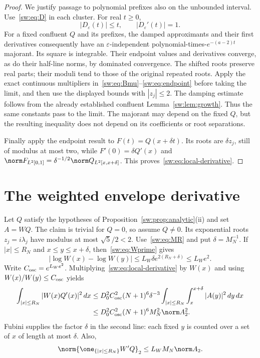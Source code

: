 \documentclass[11pt,a4paper]{article}
\numberwithin{equation}{section}
\theoremstyle{definition}\newtheorem{definition}[theorem]{Definition}
\theoremstyle{remark}\newtheorem{remark}[theorem]{Remark}
\begin{document}
\begin{proof}
We justify passage to polynomial prefixes also on the unbounded interval. Use~\eqref{sw:eq:D} in each cluster. For real $t\ge0$,
\[
 |D_\varepsilon(t)|\le t,\qquad |D_\varepsilon'(t)|=1.
\]
For a fixed confluent $Q$ and its prefixes, the damped approximants and their first derivatives consequently have an $\varepsilon$-independent polynomial-times-$e^{-(a-2)t}$ majorant. Its square is integrable. Their endpoint values and derivatives converge, as do their half-line norms, by dominated convergence. The shifted roots preserve real parts; their moduli tend to those of the original repeated roots. Apply the exact continuous multipliers in~\eqref{sw:eq:Bmu}--\eqref{sw:eq:endpoint} before taking the limit, and then use the displayed bounds with $|z_j|\le2$. The damping estimate follows from the already established confluent Lemma~\ref{sw:lem:growth}. Thus the same constants pass to the limit. The majorant may depend on the fixed $Q$, but the resulting inequality does not depend on its coefficients or root separations.

Finally apply the endpoint result to $F(t)=Q(x+\delta t)$. Its roots are $\delta z_j$, still of modulus at most two, while
$F'(0)=\delta Q'(x)$ and
$\norm F_{L^2[0,1]}=\delta^{-1/2}\norm Q_{L^2[x,x+\delta]}$.
This proves~\eqref{sw:eq:local-derivative}.
\end{proof}

\section{The weighted envelope derivative}\label{sw:sec:weighted}
Let $Q$ satisfy the hypotheses of Proposition~\ref{sw:prop:analytic}(ii) and set $A=WQ$. The claim is trivial for $Q=0$, so assume $Q\ne0$. Its exponential roots $z_j=i\lambda_j$ have modulus at most $\sqrt{5}/2<2$. Use~\eqref{sw:eq:MR} and put $\delta=M_N^{-1}$. If $|x|\le R_N$ and $x\le y\le x+\delta$, then~\eqref{sw:eq:Wprime} gives
\[
 |\log W(x)-\log W(y)|\le L_W\delta e^{2(R_N+\delta)}
 \le L_We^2.
\]
Write $C_{\rm osc}=e^{L_We^2}$. Multiplying~\eqref{sw:eq:local-derivative} by $W(x)$ and using $W(x)/W(y)\le C_{\rm osc}$ yields
\begin{align}\label{sw:eq:interior}
 \int_{|x|\le R_N}|W(x)Q'(x)|^2\,dx
 &\le D_0^2C_{\rm osc}^2(N+1)^6\delta^{-3}
       \int_{|x|\le R_N}\int_x^{x+\delta}|A(y)|^2\,dy\,dx\\
 &\le D_0^2C_{\rm osc}^2(N+1)^6M_N^2\norm A_2^2.\nonumber
\end{align}
Fubini supplies the factor $\delta$ in the second line: each fixed $y$ is counted over a set of $x$ of length at most $\delta$. Also,
\begin{equation}\label{sw:eq:interior-Wprime}
 \norm{\one_{\{|x|\le R_N\}}W'Q}_2\le L_WM_N\norm A_2.
\end{equation}
\end{document}
